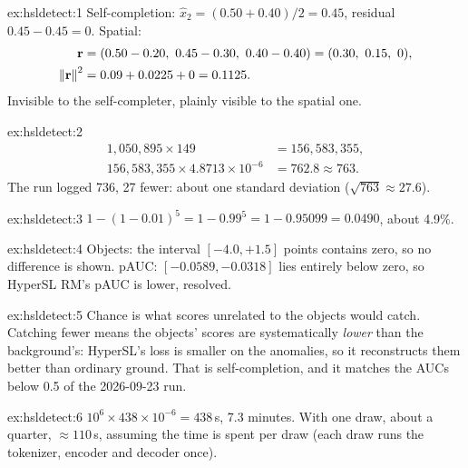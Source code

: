 
\begin{solution}{ex:hsldetect:1}
Self-completion: $\hat x_2=(0.50+0.40)/2=0.45$, residual $0.45-0.45=0$. Spatial:
\begin{align*}
\vect{r} &= (0.50-0.20,\ 0.45-0.30,\ 0.40-0.40) = (0.30,\ 0.15,\ 0),\\
\norm{\vect{r}}^2 &= 0.09+0.0225+0 = 0.1125 .
\end{align*}
Invisible to the self-completer, plainly visible to the spatial one.
\end{solution}

\begin{solution}{ex:hsldetect:2}
\begin{align*}
1{,}050{,}895\times149 &= 156{,}583{,}355,\\
156{,}583{,}355\times4.8713\times10^{-6} &= 762.8 \approx 763 .
\end{align*}
The run logged 736, 27 fewer: about one standard deviation ($\sqrt{763}\approx27.6$).
\end{solution}

\begin{solution}{ex:hsldetect:3}
$1-(1-0.01)^5=1-0.99^5=1-0.95099=0.0490$, about 4.9\%.
\end{solution}

\begin{solution}{ex:hsldetect:4}
Objects: the interval $[-4.0,+1.5]$ points contains zero, so no difference is shown. pAUC: $[-0.0589,-0.0318]$ lies
entirely below zero, so HyperSL RM's pAUC is lower, resolved.
\end{solution}

\begin{solution}{ex:hsldetect:5}
Chance is what scores unrelated to the objects would catch. Catching fewer means the objects' scores are systematically
\emph{lower} than the background's: HyperSL's loss is smaller on the anomalies, so it reconstructs them better than
ordinary ground. That is self-completion, and it matches the AUCs below 0.5 of the 2026-09-23 run.
\end{solution}

\begin{solution}{ex:hsldetect:6}
$10^6\times438\times10^{-6}=438$\,s, 7.3 minutes. With one draw, about a quarter, $\approx110$\,s, assuming the time is
spent per draw\tagA{} (each draw runs the tokenizer, encoder and decoder once).
\end{solution}
